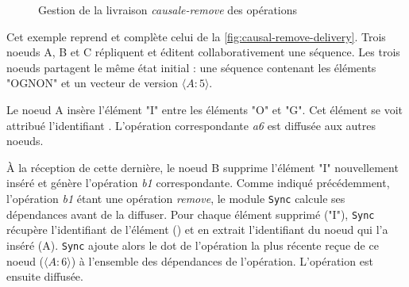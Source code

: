 \begin{figure}[!ht]
{\begin{minipage}{\linewidth}
{
        \label{fig:causal-remove-sync}
      }
      \end{minipage}
    }
  \caption{Gestion de la livraison \emph{causale-remove} des opérations}
  \label{fig:causal-remove-delivery}
\end{figure}

Cet exemple reprend et complète celui de la \autoref{fig:causal-remove-delivery}.
Trois noeuds A, B et C répliquent et éditent collaborativement une séquence.
Les trois noeuds partagent le même état initial : une séquence contenant les éléments "OGNON" et un vecteur de version $\langle A:5 \rangle$.

Le noeud A insère l'élément "I" entre les éléments "O" et "G".
Cet élément se voit attribué l'identifiant .
L'opération correspondante \emph{a6} est diffusée aux autres noeuds.

À la réception de cette dernière, le noeud B supprime l'élément "I" nouvellement inséré et génère l'opération \emph{b1} correspondante.
Comme indiqué précédemment, l'opération \emph{b1} étant une opération \emph{remove}, le module \texttt{Sync} calcule ses dépendances avant de la diffuser.
Pour chaque élément supprimé ("I"), \texttt{Sync} récupère l'identifiant de l'élément () et en extrait l'identifiant du noeud qui l'a inséré (A).
\texttt{Sync} ajoute alors le dot de l'opération la plus récente reçue de ce noeud ($\langle A:6 \rangle$) à l'ensemble des dépendances de l'opération.
L'opération est ensuite diffusée.

